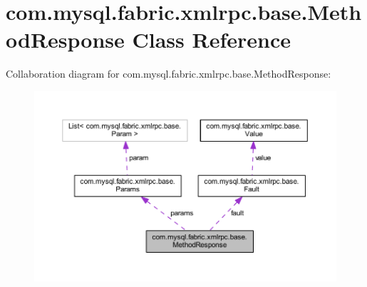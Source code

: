 \hypertarget{classcom_1_1mysql_1_1fabric_1_1xmlrpc_1_1base_1_1_method_response}{}\section{com.\+mysql.\+fabric.\+xmlrpc.\+base.\+Method\+Response Class Reference}
\label{classcom_1_1mysql_1_1fabric_1_1xmlrpc_1_1base_1_1_method_response}


Collaboration diagram for com.\+mysql.\+fabric.\+xmlrpc.\+base.\+Method\+Response\+:\nopagebreak
\begin{figure}[H]
\begin{center}
\leavevmode
\includegraphics[width=350pt]{classcom_1_1mysql_1_1fabric_1_1xmlrpc_1_1base_1_1_method_response__coll__graph}
\end{center}
\end{figure}
